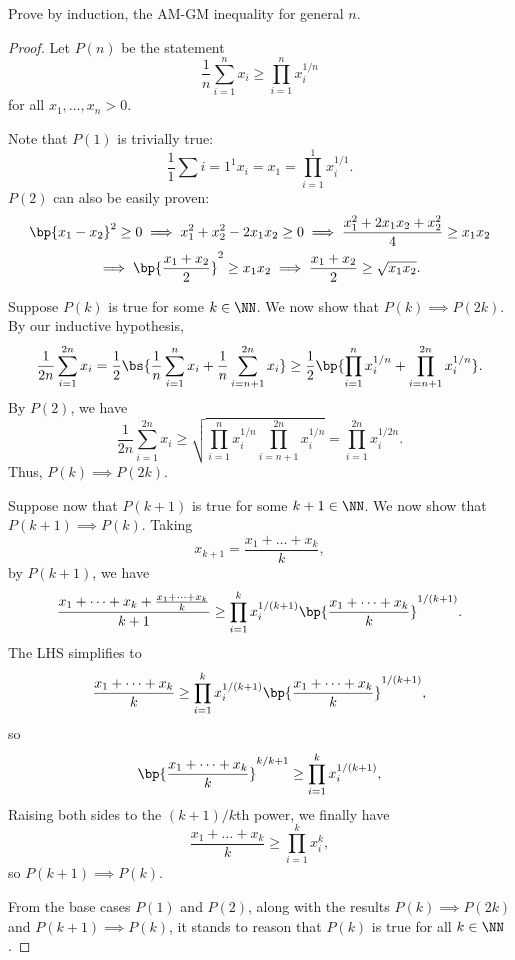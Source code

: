 \begin{problem}
    Prove by induction, the AM-GM inequality for general $n$.
\end{problem}
\begin{proof}
    Let $P(n)$ be the statement \[\frac1n \sum_{i = 1}^n x_i \geq \prod_{i = 1}^n x_i^{1/n}\] for all $x_1, \dots, x_n > 0$.

    Note that $P(1)$ is trivially true: \[\frac11 \sum{i = 1}^1 x_i = x_1 = \prod_{i = 1}^1 x_i^{1/1}.\] $P(2)$ can also be easily proven:
    \begin{gather*}
        \bp{x_1 - x_2}^2 \geq 0 \implies x_1^2 + x_2^2 - 2x_1x_2 \geq 0 \implies \frac{x_1^2 + 2x_1x_2 + x_2^2}{4} \geq x_1 x_2\\
        \implies \bp{\frac{x_1 + x_2}{2}}^2 \geq x_1 x_2 \implies \frac{x_1 + x_2}{2} \geq \sqrt{x_1 x_2}.
    \end{gather*}

    Suppose $P(k)$ is true for some $k \in \NN$. We now show that $P(k) \implies P(2k)$. By our inductive hypothesis, \[\frac1{2n} \sum_{i = 1}^{2n} x_i = \frac12 \bs{\frac1n \sum_{i = 1}^n x_i + \frac1n \sum_{i = n+1}^{2n} x_i} \geq \frac12 \bp{\prod_{i = 1}^n x_i^{1/n} + \prod_{i = n+1}^{2n} x_i^{1/n}}.\] By $P(2)$, we have \[\frac1{2n} \sum_{i = 1}^{2n} x_i \geq \sqrt{\prod_{i = 1}^n x_i^{1/n} \prod_{i = n+1}^{2n} x_i^{1/n}} = \prod_{i = 1}^{2n} x_i^{1/2n}.\] Thus, $P(k) \implies P(2k)$.

    Suppose now that $P(k+1)$ is true for some $k+1 \in \NN$. We now show that $P(k+1) \implies P(k)$. Taking \[x_{k+1} = \frac{x_1 + \dots + x_k}{k},\] by $P(k+1)$, we have \[\frac{x_1 + \dots + x_k + \frac{x_1 + \dots + x_k}{k}}{k+1} \geq \prod_{i = 1}^{k} x_i^{1/(k+1)} \bp{\frac{x_1 + \dots + x_k}{k}}^{1/(k+1)}.\] The LHS simplifies to \[\frac{x_1 +  \dots + x_k}{k} \geq \prod_{i = 1}^{k} x_i^{1/(k+1)} \bp{\frac{x_1 + \dots + x_k}{k}}^{1/(k+1)},\] so \[\bp{\frac{x_1 + \dots + x_k}{k}}^{k/k+1} \geq \prod_{i = 1}^{k} x_i^{1/(k+1)},\] Raising both sides to the $(k+1)/k$th power, we finally have \[\frac{x_1 + \dots + x_k}{k} \geq \prod_{i = 1}^{k} x_i^k,\] so $P(k+1) \implies P(k)$.

    From the base cases $P(1)$ and $P(2)$, along with the results $P(k) \implies P(2k)$ and $P(k+1)\implies P(k)$, it stands to reason that $P(k)$ is true for all $k \in \NN$.
\end{proof}

